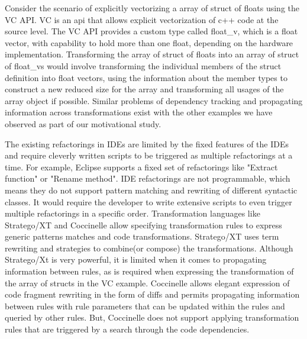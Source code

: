 \documentclass[preprint]{sigplanconf}
\begin{document}
      Consider the scenario of explicitly vectorizing a array of struct of floats using the VC API. VC is an api that allows explicit vectorization of c++ code at the source level. The VC API provides a custom type called float\_v, which is a float vector, with capability to hold more than one float, depending on the hardware implementation. Transforming the array of struct of floats into an array of struct of float\_vs  would involve transforming the individual members of the struct definition into float vectors, using the information about the member types to construct a new reduced size for the array and transforming all usages of the array object if possible. Similar problems of dependency tracking and propagating information across transformations exist  with the other examples we have observed as part of our motivational study. 
      
              The existing refactorings in IDEs are limited by the fixed features of the IDEs and require cleverly written scripts to be triggered as multiple refactorings at a time. For example, Eclipse supports a fixed set of refactorings like "Extract function" or "Rename method".  IDE refactorings are not programmable, which means they do not support pattern matching and rewriting of different syntactic classes. It would require the developer to write extensive scripts to even trigger multiple refactorings in a specific order.  Transformation languages like Stratego/XT and Coccinelle allow specifying transformation rules to express generic patterns matches and code transformations. Stratego/XT uses term rewriting and strategies to combine(or compose) the transformations. Although Stratego/Xt is very powerful, it is limited when it comes to propagating information between rules, as is required when expressing the transformation of the array of structs in the VC example. Coccinelle allows elegant expression of code fragment rewriting in the form of diffs and permits propagating information between rules with rule parameters that can be updated within the rules and queried by other rules. But, Coccinelle does not support applying transformation rules that are triggered by a search through the code dependencies.
              
\end{document}
